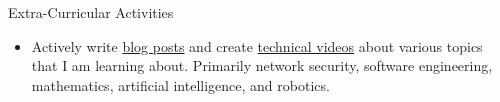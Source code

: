 \documentclass{resume} %
\begin{document}
    \begin{rSection}{Extra-Curricular Activities} 
        \begin{itemize}
            \item Actively write \href{https://gutibran.com/blog}{blog posts} and create \href{https://youtube.com/@gutibran}{technical videos} about various topics that I am learning about. Primarily network security, software engineering, mathematics, artificial intelligence, and robotics.
        \end{itemize}
    \end{rSection}

\end{document}
